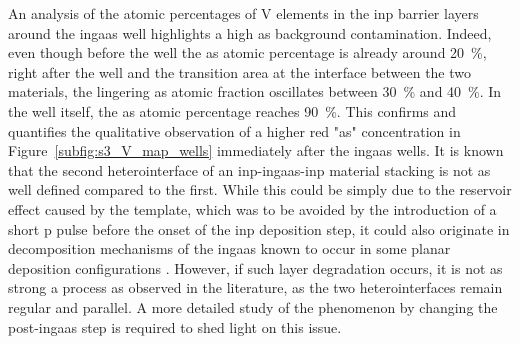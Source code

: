 An analysis of the atomic percentages of V elements in the \acs{inp} barrier layers around the \acs{ingaas} well highlights a high \acl{as} background contamination. Indeed, even though before the well the \acl{as} atomic percentage is already around \qty{20}{\%}, right after the well and the transition area at the interface between the two materials, the lingering \acl{as} atomic fraction oscillates between \qty{30}{\%} and \qty{40}{\%}. In the well itself, the \acl{as} atomic percentage reaches \qty{90}{\%}. This confirms and quantifies the qualitative observation of a higher red "\acl{as}" concentration in Figure~\ref{subfig:s3_V_map_wells} immediately after the \acs{ingaas} wells. It is known that the second heterointerface of an \acs{inp}-\acs{ingaas}-\acs{inp} material stacking is not as well defined compared to the first. While this could be simply due to the reservoir effect caused by the template, which was to be avoided by the introduction of a short \acl{p} pulse before the onset of the \acs{inp} deposition step, it could also originate in decomposition mechanisms of the \acs{ingaas} known to occur in some planar deposition configurations \cite{Decobert2002}. However, if such layer degradation occurs, it is not as strong a process as observed in the literature, as the two heterointerfaces remain regular and parallel. A more detailed study of the phenomenon by changing the post-\acs{ingaas} step is required to shed light on this issue.
\par

